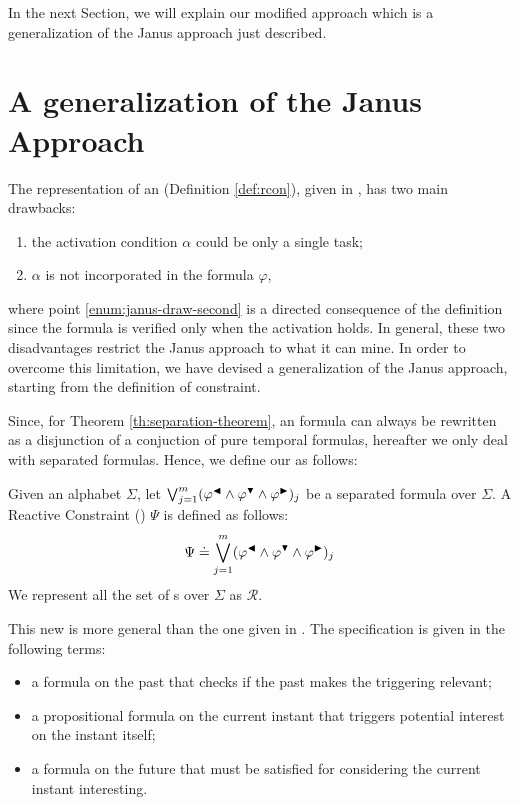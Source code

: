 In the next Section, we will explain our modified approach which is a generalization of the Janus approach just described.

\section{A generalization of the Janus Approach}
The representation of an \rcon\xspace (Definition \ref{def:rcon}), given in \cite{cecconi2018interestingness}, has two main drawbacks:
\begin{enumerate}
\item  the activation condition $\alpha$ could be only a single task;
\item $\alpha$ is not incorporated in the formula $\varphi$, \label{enum:janus-draw-second}
\end{enumerate}
where point \ref{enum:janus-draw-second} is a directed consequence of the \rcon\xspace definition since the formula is verified only when the activation holds.
In general, these two disadvantages restrict the Janus approach to what it can mine. In order to overcome this limitation, we have devised a generalization of the Janus approach, starting from the definition of \rcon\xspace constraint.

Since, for Theorem \ref{th:separation-theorem}, an \LTLp formula can always be rewritten as a disjunction of a conjuction of pure temporal formulas, hereafter we only deal with separated formulas. Hence, we define our \rcon\xspace as follows:

\begin{definition}\label{def:new-rcon}
Given an alphabet $\Sigma$, let $\bigvee^{m}_{j=1} (\varphi^{\blacktriangleleft} \wedge \varphi^{\blacktriangledown} \wedge \varphi^{\blacktriangleright})_j$ be a separated \LTLp formula over $\Sigma$. A Reactive Constraint (\rcon) $\Psi$ is defined as follows:
\begin{align}
\Psi \doteq \bigvee^{m}_{j=1} (\varphi^{\blacktriangleleft} \wedge \varphi^{\blacktriangledown} \wedge \varphi^{\blacktriangleright})_j
\label{eq:rcon}
\end{align}
We represent all the set of \rcon s over $\Sigma$ as $\mathcal{R}$.
\end{definition}
This new \rcon\xspace is more general than the one given in \cite{cecconi2018interestingness}. The specification is given in the following terms:

\begin{itemize}
\item a formula on the past that checks if the past makes the triggering relevant;
\item a propositional formula on the current instant that triggers potential interest on the instant itself;
\item a formula on the future that must be satisfied for considering the current instant interesting.
\end{itemize}


